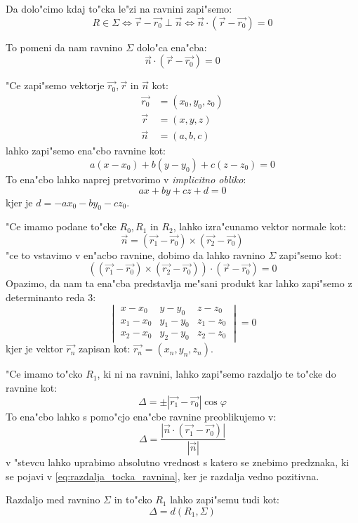 Da dolo"cimo kdaj to"cka le"zi na ravnini zapi"semo:
\[
R \in \Sigma \Leftrightarrow \vec{r} - \vec{r_0} \perp \vec{n} \Leftrightarrow \vec{n} \cdot (\vec{r} - \vec{r_0}) = 0
\]

To pomeni da nam ravnino $\Sigma$ dolo"ca ena"cba:
\[
\vec{n} \cdot (\vec{r} - \vec{r_0}) = 0
\]

"Ce zapi"semo vektorje $\vec{r_0}, \vec{r}$ in $\vec{n}$ kot:
\begin{align*}
	\vec{r_0} &= (x_0, y_0, z_0)\\
	\vec{r} &= (x, y, z)\\
	\vec{n} &= (a, b, c)
\end{align*}
lahko zapi"semo ena"cbo ravnine kot:
\[
a(x - x_0) + b(y - y_0) + c(z - z_0) = 0
\]
To ena"cbo lahko naprej pretvorimo v \emph{implicitno obliko}:
\[
ax + by + cz + d = 0
\]
kjer je $d = -ax_0 - by_0 - cz_0$.

"Ce imamo podane to"cke $R_0, R_1$ in $R_2$, lahko izra"cunamo vektor normale kot:
\[
\vec{n} =  (\vec{r_1} - \vec{r_0}) \times (\vec{r_2} - \vec{r_0})
\]
"ce to vstavimo v en"acbo ravnine, dobimo da lahko ravnino $\Sigma$ zapi"semo kot:
\[
((\vec{r_1} - \vec{r_0}) \times (\vec{r_2} - \vec{r_0})) \cdot (\vec{r} - \vec{r_0}) = 0
\]
Opazimo, da nam ta ena"cba predstavlja me"sani produkt kar lahko zapi"semo z determinanto reda 3:
\[
\begin{vmatrix}
x-x_0 & y-y_0 & z-z_0 \\
x_1 - x_0 & y_1 - y_0 & z_1 - z_0\\
x_2 - x_0 & y_2 - y_0 & z_2 - z_0
\end{vmatrix} = 0
\]
kjer je vektor $\vec{r_n}$ zapisan kot: $\vec{r_n} = (x_n, y_n, z_n)$.

"Ce imamo to"cko $R_1$, ki ni na ravnini, lahko zapi"semo razdaljo te to"cke do ravnine kot:
\begin{equation}
	\label{eq:razdalja_tocka_ravnina}
	\Delta = \pm |\vec{r_1} - \vec{r_0}| \cos \varphi
\end{equation}
To ena"cbo lahko s pomo"cjo ena"cbe ravnine preoblikujemo v:
\[
\Delta = \dfrac{|\vec{n} \cdot (\vec{r_1} - \vec{r_0})|}{|\vec{n}|}
\]
v "stevcu lahko uprabimo absolutno vrednost s katero se znebimo predznaka, ki se pojavi v \eqref{eq:razdalja_tocka_ravnina}, ker je razdalja vedno pozitivna.

Razdaljo med ravnino $\Sigma$ in to"cko $R_1$ lahko zapi"semu tudi kot:
\begin{equation*}
\Delta = d(R_1, \Sigma)
\end{equation*}

